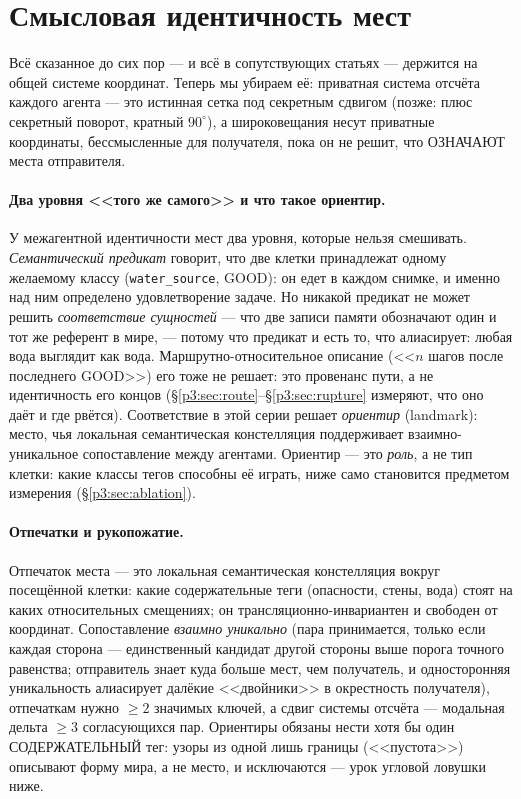 \documentclass{article}
\begin{document}
\section{Смысловая идентичность мест}
\label{p3:sec:identity}

Всё сказанное до сих пор --- и всё в сопутствующих статьях ---
держится на общей системе координат. Теперь мы убираем её: приватная
система отсчёта каждого агента --- это истинная сетка под секретным
сдвигом (позже: плюс секретный поворот, кратный $90^\circ$), а
широковещания несут приватные координаты, бессмысленные для
получателя, пока он не решит, что ОЗНАЧАЮТ места отправителя.

\paragraph{Два уровня <<того же самого>> и что такое ориентир.}
У межагентной идентичности мест два уровня, которые нельзя смешивать.
\emph{Семантический предикат} говорит, что две клетки принадлежат
одному желаемому классу (\texttt{water\_source}, GOOD): он едет в
каждом снимке, и именно над ним определено удовлетворение задаче. Но
никакой предикат не может решить \emph{соответствие сущностей} --- что
две записи памяти обозначают один и тот же референт в мире, --- потому
что предикат и есть то, что алиасирует: любая вода выглядит как вода.
Маршрутно-относительное описание (<<$n$ шагов после последнего
GOOD>>) его тоже не решает: это провенанс пути, а не идентичность его
концов (\S\ref{p3:sec:route}--\S\ref{p3:sec:rupture} измеряют, что оно даёт
и где рвётся). Соответствие в этой серии решает \emph{ориентир}
(landmark): место, чья локальная семантическая констелляция
поддерживает взаимно-уникальное сопоставление между агентами. Ориентир
--- это \emph{роль}, а не тип клетки: какие классы тегов способны её
играть, ниже само становится предметом измерения
(\S\ref{p3:sec:ablation}).

\paragraph{Отпечатки и рукопожатие.} Отпечаток места --- это локальная
семантическая констелляция вокруг посещённой клетки: какие
содержательные теги (опасности, стены, вода) стоят на каких
относительных смещениях; он трансляционно-инвариантен и свободен от
координат. Сопоставление \emph{взаимно уникально} (пара принимается,
только если каждая сторона --- единственный кандидат другой стороны
выше порога точного равенства; отправитель знает куда больше мест, чем
получатель, и односторонняя уникальность алиасирует далёкие
<<двойники>> в окрестность получателя), отпечаткам нужно $\ge 2$
значимых ключей, а сдвиг системы отсчёта --- модальная дельта $\ge 3$
согласующихся пар. Ориентиры обязаны нести хотя бы один
СОДЕРЖАТЕЛЬНЫЙ тег: узоры из одной лишь границы (<<пустота>>)
описывают форму мира, а не место, и исключаются --- урок угловой
ловушки ниже.
\end{document}
